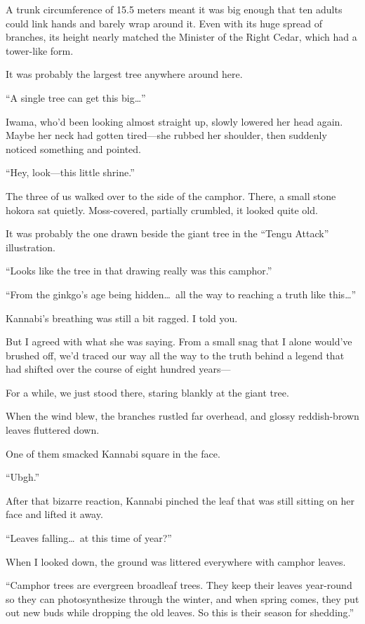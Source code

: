\documentclass[
    a4paper,
    12pt,
    twoside,
    openany,
    UTF8,
    fontset=windows
]{ctexbook}
\begin{document}
A trunk circumference of 15.5 meters meant it was big enough that ten adults could link hands and barely wrap around it. Even with its huge spread of branches, its height nearly matched the Minister of the Right Cedar, which had a tower-like form.

It was probably the largest tree anywhere around here.

``A single tree can get this big\dots''

Iwama, who'd been looking almost straight up, slowly lowered her head again. Maybe her neck had gotten tired---she rubbed her shoulder, then suddenly noticed something and pointed.

``Hey, look---this little shrine.''

The three of us walked over to the side of the camphor. There, a small stone hokora sat quietly. Moss-covered, partially crumbled, it looked quite old.

It was probably the one drawn beside the giant tree in the ``Tengu Attack'' illustration.

``Looks like the tree in that drawing really was this camphor.''

``From the ginkgo's age being hidden\dots\ all the way to reaching a truth like this\dots''

Kannabi's breathing was still a bit ragged. I told you.

But I agreed with what she was saying. From a small snag that I alone would've brushed off, we'd traced our way all the way to the truth behind a legend that had shifted over the course of eight hundred years---

For a while, we just stood there, staring blankly at the giant tree.

When the wind blew, the branches rustled far overhead, and glossy reddish-brown leaves fluttered down.

One of them smacked Kannabi square in the face.

``Ubgh.''

After that bizarre reaction, Kannabi pinched the leaf that was still sitting on her face and lifted it away.

``Leaves falling\dots\ at this time of year?''

When I looked down, the ground was littered everywhere with camphor leaves.

``Camphor trees are evergreen broadleaf trees. They keep their leaves year-round so they can photosynthesize through the winter, and when spring comes, they put out new buds while dropping the old leaves. So this is their season for shedding.''
\end{document}

